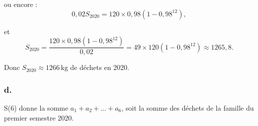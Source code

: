 \documentclass[10pt]{article}
\begin{document}
	ou encore :
	\[
	0,02S_{2020} = 120 \times 0,98(1 - 0,98^{12}),
	\]
	
	et
	\[
	S_{2020} = \dfrac{120 \times 0,98(1 - 0,98^{12})}{0,02} = 49 \times 120 (1 - 0,98^{12}) \approx 1265,8.
	\]
	
	Donc \(S_{2020} \approx 1266 \, \text{kg}\) de déchets en 2020.
	
	\subsubsection*{d.}
	

	
	S(6) donne la somme \(a_1 + a_2 + \ldots + a_6\), soit la somme des déchets de la famille du premier semestre 2020.
\end{document}
